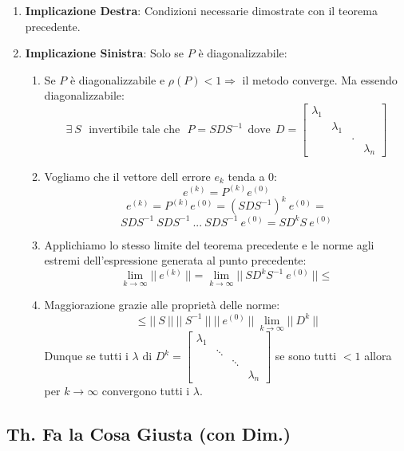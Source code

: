 \documentclass{article}
\begin{document}
\begin{enumerate}
    \item \textbf{Implicazione Destra}: Condizioni necessarie dimostrate con il teorema precedente.
    \item \textbf{Implicazione Sinistra}: Solo se $P$ è diagonalizzabile:
    \begin{enumerate}
        \item Se $P$ è diagonalizzabile e $\rho(P) < 1 \Rightarrow$ il metodo converge. Ma essendo diagonalizzabile:
        \[ \exists \: S \:\:\: \text{invertibile tale che} \:\:\: P = SDS^{-1} \:\: \text{dove} \:\: D = \begin{bmatrix}
            \lambda_{1} & & & \\
            & \lambda_{1} & & \\
            & & . & \\
            & & & \lambda_{n}
        \end{bmatrix} \]
        \newpage
        \item Vogliamo che il vettore dell errore $e_{k}$ tenda a $0$:
        \[ \boxed{e^{(k)} = P^{(k)}e^{(0)}} \]
        \[ e^{(k)} = P^{(k)}e^{(0)} = (SDS^{-1})^{k} \: e^{(0)} = \]
        \[ SDS^{-1}\: SDS^{-1} \: ... \: SDS^{-1} \: e^{(0)} = SD^{k}S\:e^{(0)} \]
        \item Applichiamo lo stesso limite del teorema precedente e le norme agli estremi dell'espressione generata al punto precedente:
        \[ \lim_{k \rightarrow \infty} ||\:e^{(k)}\:|| = \lim_{k \rightarrow \infty} ||\:SD^{k}S^{-1}\:e^{(0)}\:|| \leq \]
        \item Maggiorazione grazie alle proprietà delle norme:
        \[ \leq ||\:S\:||\:||\:S^{-1}\:||\:||\:e^{(0)}\:||\: \lim_{k \rightarrow \infty} ||\:D^{k}\:|| \]
        Dunque se tutti i $\lambda$ di $D^{k} = \begin{bmatrix}
            \lambda_{1} & & & \\
            & \ddots & & \\
            & & \ddots & \\
            & & & \lambda_{n}
        \end{bmatrix} 
        $ se sono tutti $< 1$ allora per $k \rightarrow \infty$ convergono tutti i $\lambda$.
    \end{enumerate}
\end{enumerate}

\subsection{Th. Fa la Cosa Giusta (con Dim.)}
\end{document}

